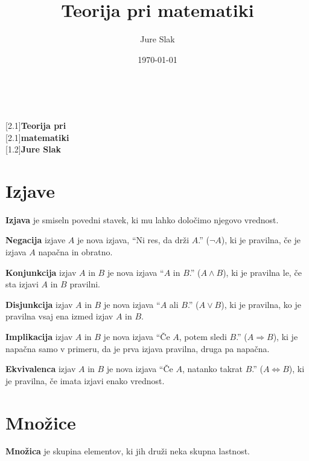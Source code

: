 \documentclass[a4paper,oneside,12pt,fleqn]{article}
\title{Teorija pri matematiki}
\author{Jure Slak}
\date{\today}
\renewcommand\implies\Rightarrow
\renewcommand\iff\Leftrightarrow
\numberwithin{equation}{section}
\begin{document}
\setlength{\abovedisplayskip}{3pt}
\setlength{\belowdisplayskip}{6pt}


\thispagestyle{empty}

\mbox{}\\
\vspace{3ex}

\noindent \scalebox{1.8}[2.1]{\textsf{{\Huge \bfseries Teorija pri}}} \\[5pt]
\scalebox{1.8}[2.1]{\textsf{{\Huge \bfseries matematiki}}} \\[60pt]
\scalebox{1}[1.2]{\textsf{\Huge \bfseries Jure Slak}}

\vspace{50pt}
\noindent \mbox{} \hspace{-20pt} 
\pagebreak

\thispagestyle{empty}
\tableofcontents
\pagebreak

\section{Izjave}
\label{sec:izjave}
\textbf{Izjava} je smiseln povedni stavek, ki mu lahko določimo njegovo vrednost.

\textbf{Negacija} izjave $A$ je nova izjava, ``Ni res, da drži $A$.'' ($\neg A$), ki je pravilna, če je izjava $A$
napačna in obratno. 

\textbf{Konjunkcija} izjav $A$ in $B$ je nova izjava ``$A$ in $B$.'' ($A \land
B$), ki je pravilna le, če sta izjavi $A$ in $B$ pravilni.

\textbf{Disjunkcija} izjav $A$ in $B$ je nova izjava ``$A$ ali $B$.'' ($A \lor B$), 
ki je pravilna, ko je pravilna vsaj ena izmed izjav $A$ in $B$.

\textbf{Implikacija} izjav $A$ in $B$ je nova izjava ``Če $A$, potem sledi $B$.'' ($A
\implies B$), ki je napačna samo v primeru, da je prva izjava pravilna, druga pa napačna.

\textbf{Ekvivalenca} izjav $A$ in $B$ je nova izjava ``Če $A$, natanko takrat $B$.'' ($A 
\iff B$), ki je pravilna, če imata izjavi enako vrednost.

\section{Množice}
\label{sec:mnozice}
\textbf{Množica} je skupina elementov, ki jih druži neka skupna lastnost. 
\end{document}
